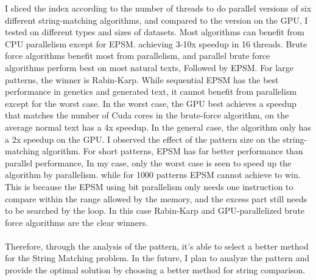 \documentclass[11pt]{article}       %
\begin{document}
I sliced the index according to the number of threads to do parallel versions of six different string-matching algorithms, and compared to the version on the GPU, I tested on different types and sizes of datasets.  Most algorithms can benefit from CPU parallelism except for EPSM. achieving 3-10x speedup in 16 threads. Brute force algorithms benefit most from parallelism, and parallel brute force algorithms perform best on most natural texts, Followed by EPSM. For large patterns, the winner is Rabin-Karp. While sequential EPSM has the best performance in genetics and generated text, it cannot benefit from parallelism except for the worst case. In the worst case, the GPU best achieves a speedup that matches the number of Cuda cores in the brute-force algorithm, on the average normal text has a 4x speedup. In the general case, the algorithm only has a 2x speedup on the GPU. I observed the effect of the pattern size on the string-matching algorithm. For short patterns, EPSM has far better performance than parallel performance, In my case, only the worst case is seen to speed up the algorithm by parallelism. while for 1000 patterns EPSM cannot achieve to win. This is because the EPSM using bit parallelism only needs one instruction to compare within the range allowed by the memory, and the excess part still needs to be searched by the loop. In this case Rabin-Karp and GPU-parallelized brute force algorithms are the clear winners.\\
\\Therefore, through the analysis of the pattern, it's able to select a better method for the String Matching problem. In the future, I plan to analyze the pattern and provide the optimal solution by choosing a better method for string comparison.
\end{document}
